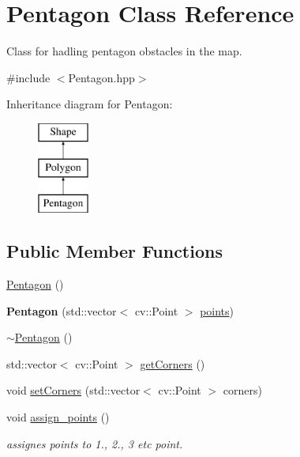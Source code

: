 \hypertarget{class_pentagon}{}\section{Pentagon Class Reference}
\label{class_pentagon}


Class for hadling pentagon obstacles in the map.  




{\ttfamily \#include $<$Pentagon.\+hpp$>$}

Inheritance diagram for Pentagon\+:\begin{figure}[H]
\begin{center}
\leavevmode
\includegraphics[height=3.000000cm]{class_pentagon}
\end{center}
\end{figure}
\subsection*{Public Member Functions}
\begin{DoxyCompactItemize}
\item 
\mbox{\hyperlink{class_pentagon_a1c5596d8ff548bfcdccc7fa53b81355c}{Pentagon}} ()
\item 
\mbox{\label{class_pentagon_ac6d6f3dad8d75557a8f8bbf5a71d52a9}} 
{\bfseries Pentagon} (std\+::vector$<$ cv\+::\+Point $>$ \mbox{\hyperlink{class_polygon_a347474823f6113a34fdefeee276d1b9e}{points}})
\item 
\mbox{\hyperlink{class_pentagon_a500031431177cee506fd7f0517d84753}{$\sim$\+Pentagon}} ()
\item 
std\+::vector$<$ cv\+::\+Point $>$ \mbox{\hyperlink{class_pentagon_ab38482973f796da34cd9ac62cefb1491}{get\+Corners}} ()
\item 
void \mbox{\hyperlink{class_pentagon_a42c8df4cbb1fcf985c96c9886a21c70a}{set\+Corners}} (std\+::vector$<$ cv\+::\+Point $>$ corners)
\item 
\mbox{\label{class_pentagon_a71ead2b4648a9772bc5be704a43df981}} 
void \mbox{\hyperlink{class_pentagon_a71ead2b4648a9772bc5be704a43df981}{assign\+\_\+points}} ()
\begin{DoxyCompactList}\small\item\em assignes points to 1., 2., 3 etc point. \end{DoxyCompactList}\end{DoxyCompactItemize}
